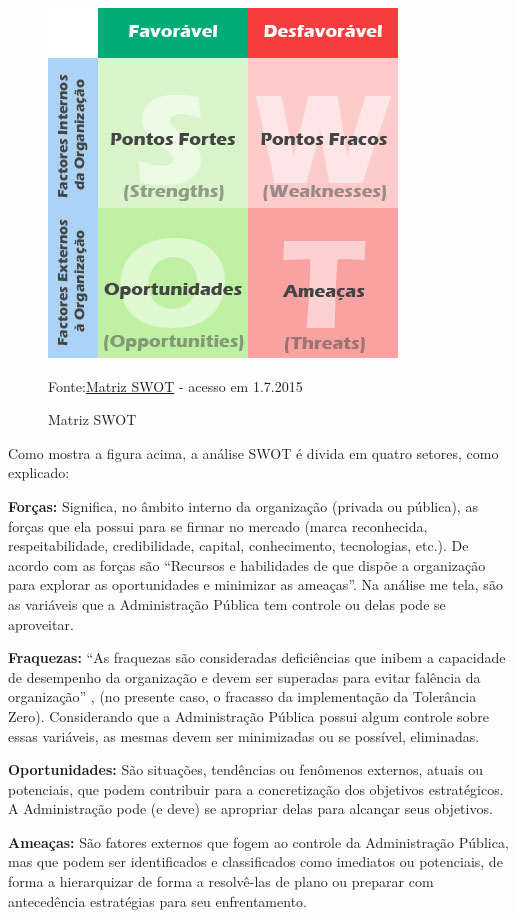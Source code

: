 \documentclass[
	12pt,				%
	openright,			%
	twoside,			%
	a4paper,			%
	chapter=TITLE,		%
	section=TITLE,		%
	subsection=TITLE,	%
	subsubsection=TITLE,%
	spanish,            %
	english,			%
	brazil				%
	]{abntex2}
\begin{document}
\begin{figure}[!h]%
	\caption{Matriz SWOT}
	\begin{center}
	\includegraphics[scale=0.7]{matriz-swot.jpg}
	\end{center}
	\ABNTEXchapterfont\small{Fonte:\href{http://blog.luz.vc/wp-content/uploads/2013/10/matriz-swot.jpg}{Matriz SWOT} - acesso em 1.7.2015}
	\label{swot}
\end{figure} 
Como mostra a figura acima, a análise SWOT é divida em quatro setores, como explicado:
\par
\textbf{Forças:} Significa, no âmbito interno da organização (privada ou pública), as forças que ela possui para se firmar no mercado (marca reconhecida,
respeitabilidade, credibilidade, capital, conhecimento, tecnologias, etc.). De acordo com  as forças são “Recursos e habilidades de que dispõe a organização para explorar as oportunidades e minimizar as ameaças”. Na análise me tela, são as variáveis que a Administração Pública tem controle ou delas pode se aproveitar.
\par
\textbf{Fraquezas:} “As fraquezas são consideradas deficiências que inibem a capacidade de desempenho da
organização e devem ser superadas para evitar falência da organização” , (no presente caso, o fracasso da implementação da Tolerância Zero). Considerando que a Administração Pública possui algum controle sobre essas variáveis, as mesmas devem ser minimizadas ou se possível, eliminadas.
\par
\textbf{Oportunidades:} São situações, tendências ou fenômenos externos, atuais ou potenciais, que podem
contribuir para a concretização dos objetivos estratégicos. A Administração pode (e deve) se apropriar delas para alcançar seus objetivos.
\par
\textbf{Ameaças:} São fatores externos que fogem ao controle da Administração Pública, mas que podem ser identificados e classificados como imediatos ou potenciais, de forma a hierarquizar de forma a resolvê-las de plano ou preparar com antecedência estratégias para seu enfrentamento.
\end{document}
